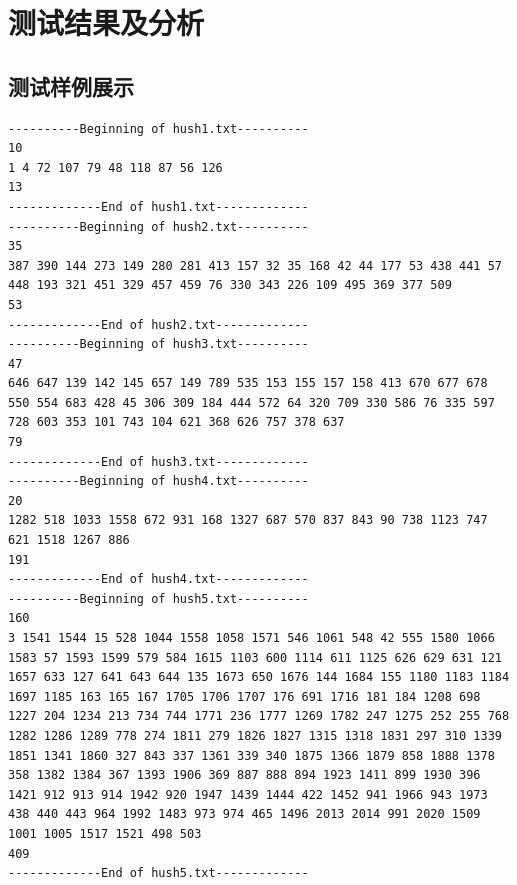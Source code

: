 \documentclass[UTF8]{ctexart}
\begin{document}
\section{测试结果及分析}
\subsection{测试样例展示}
\begin{lstlisting}
----------Beginning of hush1.txt----------
10
1 4 72 107 79 48 118 87 56 126
13
-------------End of hush1.txt-------------
----------Beginning of hush2.txt----------
35
387 390 144 273 149 280 281 413 157 32 35 168 42 44 177 53 438 441 57 448 193 321 451 329 457 459 76 330 343 226 109 495 369 377 509
53
-------------End of hush2.txt-------------
----------Beginning of hush3.txt----------
47
646 647 139 142 145 657 149 789 535 153 155 157 158 413 670 677 678 550 554 683 428 45 306 309 184 444 572 64 320 709 330 586 76 335 597 728 603 353 101 743 104 621 368 626 757 378 637
79
-------------End of hush3.txt-------------
----------Beginning of hush4.txt----------
20
1282 518 1033 1558 672 931 168 1327 687 570 837 843 90 738 1123 747 621 1518 1267 886
191
-------------End of hush4.txt-------------
----------Beginning of hush5.txt----------
160
3 1541 1544 15 528 1044 1558 1058 1571 546 1061 548 42 555 1580 1066 1583 57 1593 1599 579 584 1615 1103 600 1114 611 1125 626 629 631 121 1657 633 127 641 643 644 135 1673 650 1676 144 1684 155 1180 1183 1184 1697 1185 163 165 167 1705 1706 1707 176 691 1716 181 184 1208 698 1227 204 1234 213 734 744 1771 236 1777 1269 1782 247 1275 252 255 768 1282 1286 1289 778 274 1811 279 1826 1827 1315 1318 1831 297 310 1339 1851 1341 1860 327 843 337 1361 339 340 1875 1366 1879 858 1888 1378 358 1382 1384 367 1393 1906 369 887 888 894 1923 1411 899 1930 396 1421 912 913 914 1942 920 1947 1439 1444 422 1452 941 1966 943 1973 438 440 443 964 1992 1483 973 974 465 1496 2013 2014 991 2020 1509 1001 1005 1517 1521 498 503
409
-------------End of hush5.txt-------------
\end{lstlisting}
\end{document}
